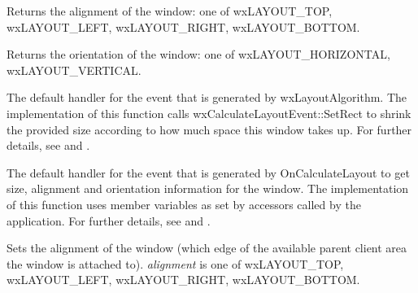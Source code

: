 \label{wxsashlayoutwindowgetalignment}


Returns the alignment of the window: one of wxLAYOUT\_TOP, wxLAYOUT\_LEFT, wxLAYOUT\_RIGHT, wxLAYOUT\_BOTTOM.

\label{wxsashlayoutwindowgetorientation}


Returns the orientation of the window: one of wxLAYOUT\_HORIZONTAL, wxLAYOUT\_VERTICAL.

\label{wxsashlayoutwindowoncalculatelayout}


The default handler for the event that is generated by wxLayoutAlgorithm. The implementation
of this function calls wxCalculateLayoutEvent::SetRect to shrink the provided size according to
how much space this window takes up. For further details,
see  and .

\label{wxsashlayoutwindowonquerylayoutinfo}


The default handler for the event that is generated by OnCalculateLayout to get
size, alignment and orientation information for the window. The implementation
of this function uses member variables as set by accessors called by the application.
For further details, see  and .

\label{wxsashlayoutwindowsetalignment}


Sets the alignment of the window (which edge of the available parent client area the window
is attached to). {\it alignment} is one of wxLAYOUT\_TOP, wxLAYOUT\_LEFT, wxLAYOUT\_RIGHT, wxLAYOUT\_BOTTOM.

\label{wxsashlayoutwindowsetdefaultsize}

